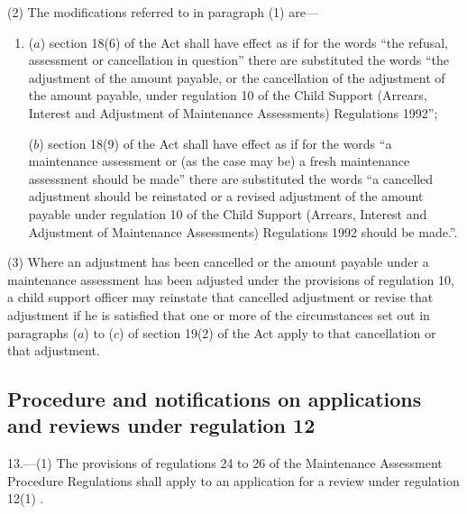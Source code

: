 \documentclass[12pt,a4paper]{article}
\begin{document}
(2) The modifications referred to in paragraph (1) are—
\begin{enumerate}\item[]
($a$) section 18(6) of the Act shall have effect as if for the words “the refusal, assessment or cancellation in question” there are substituted the words “the adjustment of the amount payable, or the cancellation of the adjustment of the amount payable, under regulation 10 of the Child Support (Arrears, Interest and Adjustment of Maintenance Assessments) Regulations 1992”;

($b$) section 18(9) of the Act shall have effect as if for the words “a maintenance assessment or (as the case may be) a fresh maintenance assessment should be made” there are substituted the words “a cancelled adjustment should be reinstated or a revised adjustment of the amount payable under regulation 10 of the Child Support (Arrears, Interest and Adjustment of Maintenance Assessments) Regulations 1992 should be made.”.
\end{enumerate}

(3) Where an adjustment has been cancelled or the amount payable under a maintenance assessment has been adjusted under the provisions of regulation 10, a child support officer may reinstate that cancelled adjustment or revise that adjustment if he is satisfied that one or more of the circumstances set out in paragraphs ($a$) to ($c$) of section 
19(2)  %
of the Act apply to that cancellation or that adjustment.


\subsection[13. Procedure and notifications on applications and reviews under regulation 12]{Procedure and notifications on applications and reviews under regulation 12}

13.—(1) The provisions of regulations 24 to 26 of the Maintenance Assessment Procedure Regulations shall apply to an application for a review under regulation 12(1)%
.
\end{document}
